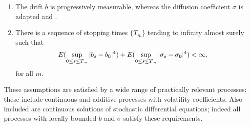 \begin{ass}\label{as:vol}\mbox{} 
  \begin{enumerate}
    \item The drift $b$ is progressively measurable, whereas the diffusion coefficient $\sigma$  is adapted and \cadlag.
    \item There is a sequence of stopping times $\{T_m\}$ tending to infinity almost surely such that   
      \begin{align}
       E( \sup_{0 \le  s \le T_m} \vert b_s  - b_0\vert^4) + E( \sup_{0 \le  s \le T_m} \vert \sigma_s  - \sigma_0\vert^4)< \infty,\notag
        \label{}
      \end{align}
      for all $m$. 
  \end{enumerate}
\end{ass}
\begin{remark}
  These assumptions are satisfied by a wide range of practically relevant processes; these  include  continuous \levy and additive  processes with \cadlag  volatility coefficients. Also included are  continuous solutions of stochastic differential equations; indeed  all processes with locally bounded $b$ and $\sigma$ satisfy these requirements. 
\end{remark}

